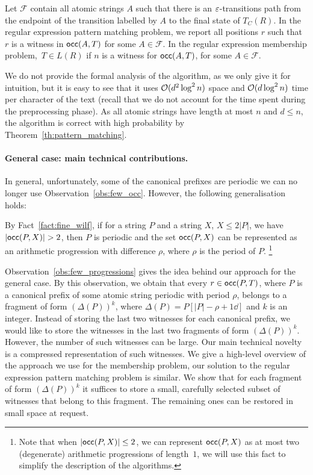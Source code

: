 Let $\mathcal{F}$ contain all atomic strings $A$ such that there is an $\varepsilon$-transitions path from the endpoint of the transition labelled by $A$ to the final state of $T_C(R)$. In the regular expression pattern matching problem, we report all positions $r$ such that $r$ is a witness in $\mathsf{occ}(A,T)$ for some $A\in \mathcal{F}$. In the regular expression membership problem,~$T \in L(R)$ if $n$ is a witness for $\mathsf{occ}(A,T)$, for some $A\in \mathcal{F}$.

We do not provide the formal analysis of the algorithm, as we only give it for intuition, but it is easy to see that it uses $\mathcal{O}(d^2 \log^2 n)$ space and $\mathcal{O}(d \log^2 n)$ time per character of the text (recall that we do not account for the time spent during the preprocessing phase). As all atomic strings have length at most $n$ and $d \le n$, the algorithm is correct with high probability by Theorem~\ref{th:pattern_matching}.

\paragraph{General case: main technical contributions.}
In general, unfortunately, some of the canonical prefixes are periodic we can no longer use Observation~\ref{obs:few_occ}. However, the following generalisation holds:

\begin{observation}\label{obs:few_progressions}
By Fact~\ref{fact:fine_wilf}, if for a string $P$ and a string $X$, $X \le 2|P|$, we have $|\mathsf{occ}(P,X)| > 2$, then $P$ is periodic and the set $\mathsf{occ}(P,X)$ can be represented as an arithmetic progression with difference $\rho$, where $\rho$ is the period of $P$. \footnote{Note that when $|\mathsf{occ}(P,X)| \le 2$, we can represent $\mathsf{occ}(P,X)$ as at most two (degenerate) arithmetic progressions of length~$1$, we will use this fact to simplify the description of the algorithms.}
\end{observation}

Observation~\ref{obs:few_progressions} gives the idea behind our approach for the general case. By this observation, we obtain that every $r \in \mathsf{occ}(P,T)$, where $P$ is a canonical prefix of some atomic string periodic with period $\rho$, belongs to a fragment of form $(\Delta(P))^k$, where $\Delta(P) = P[|P|-\rho+1 \dd]$ and $k$ is an integer. 
Instead of storing the last two witnesses for each canonical prefix, we would like to store the witnesses in the last two fragments of form $(\Delta(P))^k$. However, the number of such witnesses can be large. Our main technical novelty is a compressed representation of such witnesses. We give a high-level overview of the approach we use for the membership problem, our solution to the regular expression pattern matching problem is similar. We show that for each fragment of form $(\Delta(P))^k$ it suffices to store a small, carefully selected subset of witnesses that belong to this fragment. The remaining ones can be restored in small space at request. 


